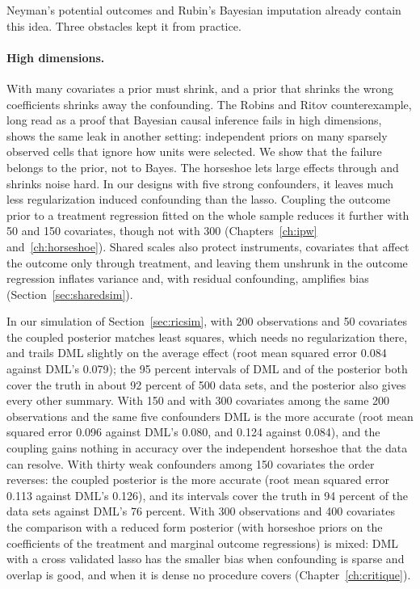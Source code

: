 Neyman's potential outcomes and Rubin's Bayesian imputation already contain this idea. Three obstacles kept it from practice.

\paragraph{High dimensions.} With many covariates a prior must shrink, and a prior that shrinks the wrong coefficients shrinks away the confounding. The Robins and Ritov counterexample, long read as a proof that Bayesian causal inference fails in high dimensions, shows the same leak in another setting: independent priors on many sparsely observed cells that ignore how units were selected. We show that the failure belongs to the prior, not to Bayes. The horseshoe lets large effects through and shrinks noise hard. In our designs with five strong confounders, it leaves much less regularization induced confounding than the lasso. Coupling the outcome prior to a treatment regression fitted on the whole sample reduces it further with 50 and 150 covariates, though not with 300 (Chapters~\ref{ch:ipw} and~\ref{ch:horseshoe}). Shared scales also protect instruments, covariates that affect the outcome only through treatment, and leaving them unshrunk in the outcome regression inflates variance and, with residual confounding, amplifies bias (Section~\ref{sec:sharedsim}).

In our simulation of Section~\ref{sec:ricsim}, with 200 observations and 50 covariates the coupled posterior matches least squares, which needs no regularization there, and trails DML slightly on the average effect (root mean squared error 0.084 against DML's 0.079); the 95 percent intervals of DML and of the posterior both cover the truth in about 92 percent of 500 data sets, and the posterior also gives every other summary. With 150 and with 300 covariates among the same 200 observations and the same five confounders DML is the more accurate (root mean squared error 0.096 against DML's 0.080, and 0.124 against 0.084), and the coupling gains nothing in accuracy over the independent horseshoe that the data can resolve. With thirty weak confounders among 150 covariates the order reverses: the coupled posterior is the more accurate (root mean squared error 0.113 against DML's 0.126), and its intervals cover the truth in 94 percent of the data sets against DML's 76 percent. With 300 observations and 400 covariates the comparison with a reduced form posterior (with horseshoe priors on the coefficients of the treatment and marginal outcome regressions) is mixed: DML with a cross validated lasso has the smaller bias when confounding is sparse and overlap is good, and when it is dense no procedure covers (Chapter~\ref{ch:critique}).


